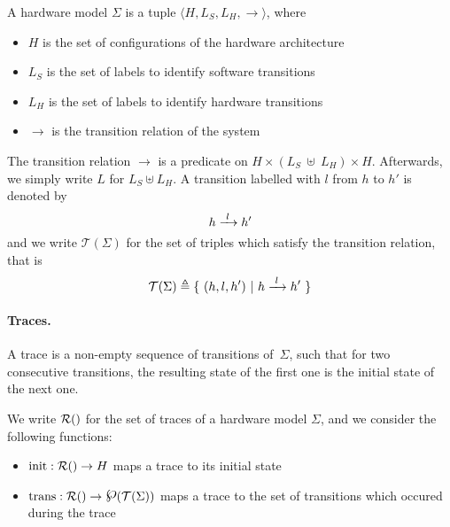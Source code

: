 \begin{definition}
  \label{def:speccert:model}
  A hardware model $\Sigma$ is a tuple
  $\langle H, L_S, L_H, \rightarrow \rangle$, where
  \begin{itemize}
  \item $H$ is the set of configurations of the hardware architecture
  \item $L_S$ is the set of labels to identify software transitions
  \item $L_H$ is the set of labels to identify hardware transitions
  \item $\rightarrow$ is the transition relation of the system
  \end{itemize}

  The transition relation $\rightarrow$ is a predicate on
  $H \times (L_S~\uplus~L_H) \times H$.
  Afterwards, we simply write $L$ for $L_S \uplus L_H$.
  A transition labelled with $l$ from $h$ to $h'$ is denoted by
  \[
    h \xrightarrow{\hskip0.3em\relax l\hskip0.3em\relax} h'
  \]
  and we write $\mathcal{T}(\Sigma)$ for the set of triples which satisfy the
  transition relation, that is
  \[
    \mathcal{T}(\Sigma) \triangleq \{\ (h, l, h')\ |\ h \xrightarrow{\hskip0.3em\relax l\hskip0.3em\relax} h'\ \}
  \]
\end{definition}


\paragraph{Traces.}
A trace is a non-empty sequence of transitions of~$\Sigma$, such that for two
consecutive transitions, the resulting state of the first one is the initial
state of the next one. 

\begin{definition}[Traces]
  \label{def:speccert:trace}
  We write $\pathesLTS{Ez}$ for the set of traces of a hardware model $\Sigma$,
  and we consider the following functions:
  \begin{itemize}
  \item $\func{init} : \pathesLTS{Ez} \rightarrow H$ maps a trace to its initial
    state
  \item
    $\func{trans} : \pathesLTS{Ez} \rightarrow \powerset(\mathcal{T}(\Sigma))$
    maps a trace to the set of transitions which occured during the trace
  \end{itemize}
\end{definition}

